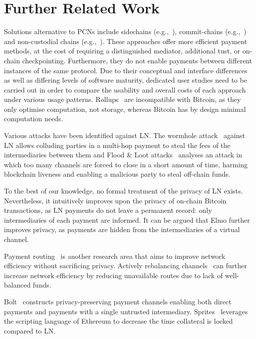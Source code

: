 \section{Further Related Work}
\label{sec:further-related-work}
  Solutions alternative to PCNs include side\-chains
  (e.g.,~\cite{BCDF+14,sidechains,KiaZin18}), commit-chains
  (e.g.,~\cite{plasma,10.1007/978-3-031-54776-8_2}) and non-cu\-sto\-di\-al chains
  (e.g.,~\cite{plasma,konstantopoulos2019plasma,plasma-lower-bounds}). These
  approaches offer more efficient payment methods, at the cost of
  requiring a distinguished mediator, additional tust, or on-chain
  checkpointing. Furthermore, they do not enable payments between different instances
  of the same protocol.
  Due to their conceptual and interface differences as
  well as differing levels of software maturity, dedicated user studies need to
  be carried out in order to compare the usability and overall costs of each
  approach under various usage patterns. Rollups~\cite{ZKRollup,Optimism} are
  incompatible with Bitcoin, as they only optimise computation, not storage,
  whereas Bitcoin has by design minimal computation needs.

Various attacks have been identified against LN. The wormhole
  attack~\cite{DBLP:conf/ndss/MalavoltaMSKM19} against LN allows
  colluding parties in a multi-hop payment to steal the fees of the
  intermediaries between them and Flood \& Loot attacks~\cite{10.1145/3419614.3423248}
  analyses an attack in which too many channels are forced to
  close in a short amount of time, harming blockchain liveness and enabling
  a malicious party to steal off-chain funds.

  To the best of our knowledge, no formal treatment of the privacy of LN exists.
  Nevertheless, it intuitively improves upon the privacy of on-chain Bitcoin
  transactions, as LN payments do not leave a permanent record: only
  intermediaries of each payment are informed. It can be argued that Elmo
  further improves privacy, as payments are hidden from
  the intermediaries of a virtual channel.

  Payment routing~\cite{spider,prihodko2016flare,lee2020routee} is another research area that aims to improve network efficiency without sacrificing  privacy. Actively rebalancing channels~\cite{DBLP:conf/ccs/KhalilG17} can
  further increase network efficiency by reducing unavailable routes due to lack of well-balanced funds.

  Bolt~\cite{10.1145/3133956.3134093} constructs privacy-preserving payment
  channels enabling both direct payments and payments with a single untrusted
  intermediary. Sprites~\cite{sprites} leverages the scripting language of
  E\-the\-re\-um to decrease the time collateral is locked compared to LN.

